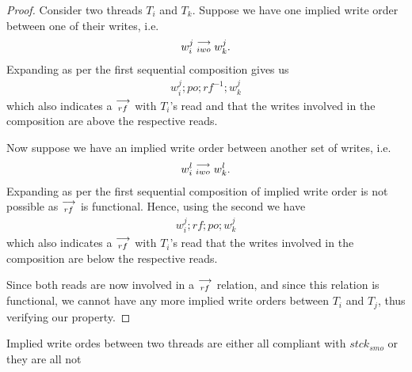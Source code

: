     \begin{proof}
        Consider two threads $T_i$ and $T_k$. Suppose we have one implied write order between one of their writes, i.e. 
        \begin{align}
            w_i^j\stackrel{\longrightarrow}{_{iwo}}w_k^j.    
        \end{align}
        Expanding as per the first sequential composition gives us 
        \begin{align}
            w_i^j;po;rf^{-1};w_k^j
        \end{align}
        which also indicates a $\stackrel{\longrightarrow}{_{rf}}$ with $T_i$'s read and that the writes involved in the composition are above the respective reads.

        Now suppose we have an implied write order between another set of writes, i.e.
        \begin{align}
            w_i^l\stackrel{\longrightarrow}{_{iwo}}w_k^l.    
        \end{align}
        Expanding as per the first sequential composition of implied write order is not possible as $\stackrel{\longrightarrow}{_{rf}}$ is functional. Hence, using the second we have
        \begin{align}
            w_i^j;rf;po;w_k^j 
        \end{align}  
        which also indicates a $\stackrel{\longrightarrow}{_{rf}}$ with $T_i$'s read that the writes involved in the composition are below the respective reads.

        Since both reads are now involved in a $\stackrel{\longrightarrow}{_{rf}}$ relation, and since this relation is functional, we cannot have any more implied write orders between $T_i$ and $T_j$, thus verifying our property. 

    \end{proof}
        

    \begin{property}
        Implied write ordes between two threads are either all compliant with $stck{_{smo}}$ or they are all not
    \end{property}


